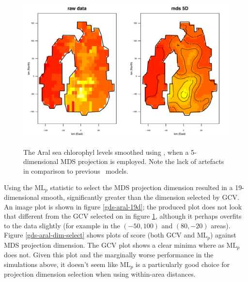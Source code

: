 \begin{figure}
\centering
\includegraphics[width=6in]{mds/figs/aral-5d-duchon.pdf} \\
\caption{The Aral sea chlorophyl levels smoothed using \mdsds, when a 5-dimensional MDS projection is employed. Note the lack of artefacts in comparison to previous \mdsap\ models.}
\label{mds-aral-5d-duchon}
\end{figure}

Using the $\text{ML}_p$ statistic to select the MDS projection dimension resulted in a 19-dimensional smooth, significantly greater than the dimension selected by GCV. An image plot is shown in figure \ref{gds-aral-19d}; the produced plot does not look that different from the GCV selected on in figure \ref{mds-aral-5d-duchon}, although it perhaps overfits to the data slightly (for example in the $(-50,100)$ and $(80,-20)$ areas). Figure \ref{gds-aral-dim-select} shows plots of score (both GCV and $\text{ML}_p$) against MDS projection dimension. The GCV plot shows a clear minima where as $\text{ML}_p$ does not. Given this plot and the marginally worse performance in the simulations above, it doesn't seem like $\text{ML}_p$ is a particularly good choice for projection dimension selection when using within-area distances.


